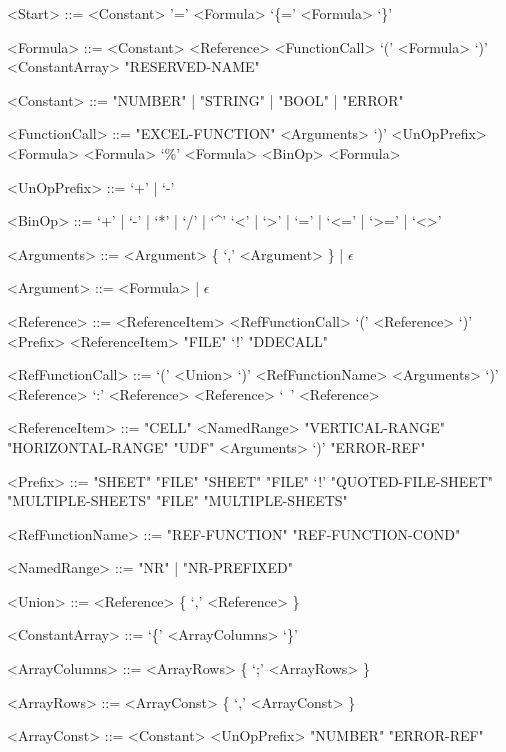\begin{grammar}
<Start> ::= <Constant>
	\alt '=' <Formula>
	\alt `\{=' <Formula> `\}'

<Formula> ::= <Constant>
         \alt <Reference>
         \alt <FunctionCall>
         \alt `(' <Formula> `)'
         \alt <ConstantArray>
         \alt "RESERVED-NAME"
         
<Constant> ::= "NUMBER" | "STRING" | "BOOL" | "ERROR"
         
<FunctionCall> ::= "EXCEL-FUNCTION" <Arguments> `)'
		\alt <UnOpPrefix> <Formula>
		\alt <Formula> `\%'
		\alt <Formula> <BinOp> <Formula>
		
<UnOpPrefix> ::= `+' | `-'

<BinOp> ::= `+' | `-' | `*' | `/' | `\textasciicircum'
	\alt `<' | `>' | `=' | `<=' | `>=' | `<>'

	
<Arguments> ::= <Argument> \{ `,' <Argument> \} | $\epsilon$

<Argument> ::= <Formula> | $\epsilon$

<Reference> ::= <ReferenceItem>
    \alt <RefFunctionCall>
	\alt `(' <Reference> `)' 
	\alt <Prefix> <ReferenceItem>
	\alt "FILE" `!' "DDECALL"

<RefFunctionCall> ::= `(' <Union> `)'
    \alt <RefFunctionName> <Arguments> `)'
    \alt <Reference> `:' <Reference>
	\alt <Reference> `\ ' <Reference>
    
<ReferenceItem> ::= "CELL"
	\alt <NamedRange>
	\alt "VERTICAL-RANGE"
	\alt "HORIZONTAL-RANGE"
	\alt "UDF" <Arguments> `)'
	\alt "ERROR-REF"
	
<Prefix> ::= "SHEET"
	\alt "FILE" "SHEET"
	\alt "FILE" `!'
	\alt "QUOTED-FILE-SHEET"
	\alt "MULTIPLE-SHEETS"
	\alt "FILE" "MULTIPLE-SHEETS"

<RefFunctionName> ::= "REF-FUNCTION"
			\alt "REF-FUNCTION-COND"
	
<NamedRange> ::= "NR" | "NR-PREFIXED"

<Union> ::= <Reference> \{ `,' <Reference> \}
	

<ConstantArray> ::= `\{' <ArrayColumns> `\}'

<ArrayColumns> ::= <ArrayRows> \{ `;' <ArrayRows> \}

<ArrayRows> ::= <ArrayConst> \{ `,' <ArrayConst> \}
	
<ArrayConst> ::= <Constant>
	\alt <UnOpPrefix> "NUMBER"
	\alt "ERROR-REF"

\end{grammar}